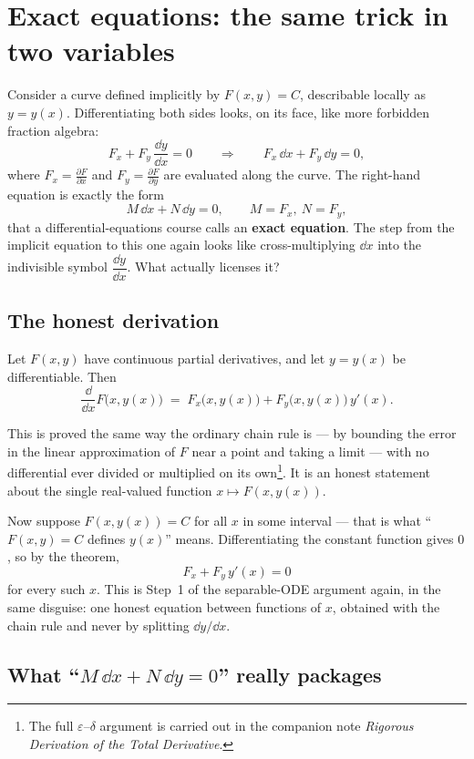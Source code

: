 \documentclass{essay}
\newcommand{\ddx}[1]{\frac{\dd #1}{\dd x}}
\newcommand{\pd}[2]{\frac{\partial #1}{\partial #2}}
\begin{document}
\section{Exact equations: the same trick in two variables}

Consider a curve defined implicitly by \(F(x,y)=C\), describable locally as
\(y=y(x)\). Differentiating both sides looks, on its face, like more
forbidden fraction algebra:
\[ F_{x} + F_{y}\,\ddx{y} = 0 \qquad\Longrightarrow\qquad F_{x}\,\dd x + F_{y}\,\dd y = 0, \]
where \(F_{x}=\pd{F}{x}\) and \(F_{y}=\pd{F}{y}\) are evaluated along the curve.
The right-hand equation is exactly the form
\[ M\,\dd x + N\,\dd y = 0, \qquad M=F_{x},\ N=F_{y}, \]
that a differential-equations course calls an \textbf{exact equation}.
The step from the implicit equation to this one again looks like
cross-multiplying \(\dd x\) into the indivisible symbol \(\dfrac{\dd y}{\dd
x}\). What actually licenses it?

\subsection{The honest derivation}

\begin{theorem}
  Let \(F(x,y)\) have continuous partial derivatives, and let \(y=y(x)\)
  be differentiable. Then
  \[ \frac{\dd}{\dd x}F\bigl(x,y(x)\bigr) \;=\; F_{x}\bigl(x,y(x)\bigr) + F_{y}\bigl(x,y(x)\bigr)\,y'(x). \]
\end{theorem}
This is proved the same way the ordinary chain rule is --- by bounding
the error in the linear approximation of \(F\) near a point and taking a
limit --- with no differential ever divided or multiplied on its
own\footnote{The full \(\varepsilon\)--\(\delta\) argument is carried out
  in the companion note \emph{Rigorous Derivation of the Total
Derivative}.}. It is an honest statement about the single real-valued
function \(x\mapsto F(x,y(x))\).

Now suppose \(F(x,y(x))=C\) for all \(x\) in some interval --- that is
what ``\(F(x,y)=C\) defines \(y(x)\)'' means. Differentiating the constant
function gives \(0\), so by the theorem,
\[ F_{x} + F_{y}\,y'(x) = 0 \]
for every such \(x\). This is Step~1 of the separable-ODE argument again,
in the same disguise: one honest equation between functions of \(x\),
obtained with the chain rule and never by splitting \(\dd y/\dd x\).

\subsection{What ``\(M\,\dd x+N\,\dd y=0\)'' really packages}
\end{document}
